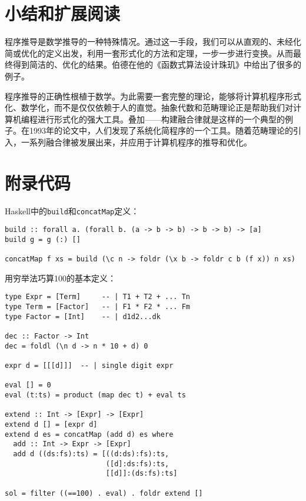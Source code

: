 \documentclass[b5paper]{ctexart}
\begin{document}
\begin{Exercise}
\end{Exercise}

\section{小结和扩展阅读}

程序推导是数学推导的一种特殊情况。通过这一手段，我们可以从直观的、未经化简或优化的定义出发，利用一套形式化的方法和定理，一步一步进行变换。从而最终得到简洁的、优化的结果。伯德在他的《函数式算法设计珠玑》\cite{Bird-2010}中给出了很多的例子。

程序推导的正确性根植于数学。为此需要一套完整的理论，能够将计算机程序形式化、数学化，而不是仅仅依赖于人的直觉。抽象代数和范畴理论正是帮助我们对计算机编程进行形式化的强大工具。叠加——构建融合律就是这样的一个典型的例子。在1993年的论文\cite{GLPJ-1993}中，人们发现了系统化简程序的一个工具。随着范畴理论的引入，一系列融合律被发展出来\cite{Hinze-Harper-James-2010}，并应用于计算机程序的推导和优化。

\section{附录代码}

Haskell中的\texttt{build}和\texttt{concatMap}定义：

\lstset{frame=single}
\begin{lstlisting}
build :: forall a. (forall b. (a -> b -> b) -> b -> b) -> [a]
build g = g (:) []

concatMap f xs = build (\c n -> foldr (\x b -> foldr c b (f x)) n xs)
\end{lstlisting}

用穷举法巧算100的基本定义：
\begin{lstlisting}
type Expr = [Term]     -- | T1 + T2 + ... Tn
type Term = [Factor]   -- | F1 * F2 * ... Fm
type Factor = [Int]    -- | d1d2...dk

dec :: Factor -> Int
dec = foldl (\n d -> n * 10 + d) 0

expr d = [[[d]]]  -- | single digit expr

eval [] = 0
eval (t:ts) = product (map dec t) + eval ts

extend :: Int -> [Expr] -> [Expr]
extend d [] = [expr d]
extend d es = concatMap (add d) es where
  add :: Int -> Expr -> [Expr]
  add d ((ds:fs):ts) = [((d:ds):fs):ts,
                        ([d]:ds:fs):ts,
                        [[d]]:(ds:fs):ts]

sol = filter ((==100) . eval) . foldr extend []
\end{lstlisting}
\end{document}
